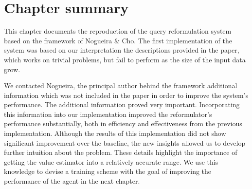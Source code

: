 \section{Chapter summary}


This chapter documents the reproduction of the query reformulation system based on the framework of Nogueira \& Cho\cite{nogueira2017task}. The first implementation of the system was based on our interpretation the descriptions provided in the paper, which works on trivial problems, but fail to perform as the size of the input data grow. 

We contacted Nogueira, the principal author behind the framework additional information which was not included in the paper in order to improve the system's performance. The additional information proved very important. Incorporating this information into our implementation improved the reformulator's performance substantially, both in efficiency and effectiveness from the previous implementation. Although the results of this implementation did not show significant improvement over the baseline, the new insights allowed us to develop further intuition about the problem. These details highlight the importance of getting the value estimator into a relatively accurate range. We use this knowledge to devise a training scheme with the goal of improving the performance of the agent in the next chapter. 


